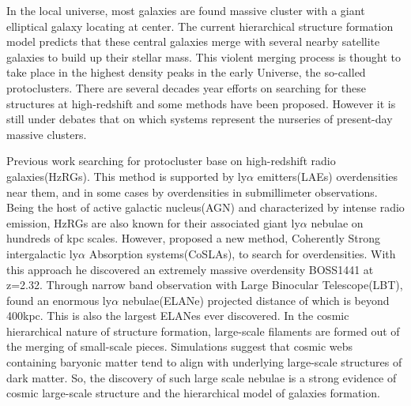 \documentclass[../main.tex]{subfiles}
\begin{document}
In the local universe, most galaxies are found massive cluster with 
a giant elliptical galaxy locating at center. The current hierarchical 
structure formation model predicts that these central galaxies merge 
with several nearby satellite galaxies to build up their stellar mass. 
This violent merging process is thought to take place in the highest 
density peaks in the early Universe, the so-called protoclusters. 
There are several decades year efforts on searching for these structures 
at high-redshift and some methods have been proposed. However it is still 
under debates that on which systems represent the nurseries of present-day 
massive clusters. 

Previous work searching for protocluster base on high-redshift radio galaxies(HzRGs). This method is supported by ly$\alpha$ emitters(LAEs) overdensities near them, and in some cases by overdensities in submillimeter observations. Being the host of active galactic nucleus(AGN) and characterized by intense radio emission, HzRGs are also known for their associated giant ly$\alpha$ nebulae on hundreds of kpc scales. However, \cite{cai2015mapping} proposed a new method, Coherently Strong intergalactic ly$\alpha$ Absorption systems(CoSLAs), to search for overdensities. With this approach he discovered an extremely massive overdensity BOSS1441 at z=2.32. Through narrow band observation with Large Binocular Telescope(LBT),\cite{cai2017discovery} found an enormous ly$\alpha$ nebulae(ELANe) projected distance of which is beyond 400kpc. This is also the largest ELANes ever discovered. In the cosmic hierarchical nature of structure formation, large-scale filaments are formed out of the merging of small-scale pieces. Simulations suggest that cosmic webs containing baryonic matter tend to align with underlying large-scale structures of dark matter. So, the discovery of such large scale nebulae is a strong evidence of cosmic large-scale structure and the hierarchical model of galaxies formation.
\end{document}
